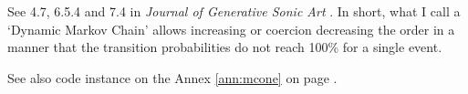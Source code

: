 \bigskip
\bigskip


\bigskip

See  4.7, 6.5.4 and 7.4 in \textsl{Journal of Generative Sonic Art} \citep{yi}. In short, what I call a `Dynamic Markov Chain' allows increasing or coercion decreasing the order in a manner that the transition probabilities do not reach 100\% for a single event.
 
See also code instance on the Annex \ref{ann:mcone} on page \pageref{ann:mcone}.

%
%

